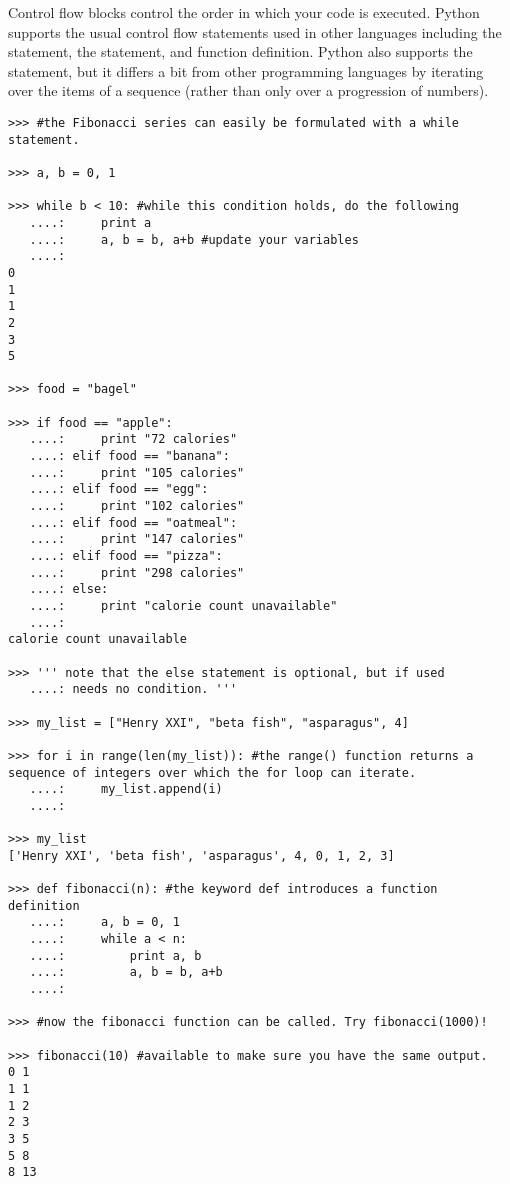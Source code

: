 \begin{example}
Control flow blocks control the order in which your code is executed.
Python supports the usual control flow statements used in other languages
including the  statement, the  statement, and function definition. 
Python also supports the  statement, but it differs a bit from other programming languages by iterating over the items of a sequence (rather than only over a progression of numbers).

\begin{lstlisting}
>>> #the Fibonacci series can easily be formulated with a while statement.

>>> a, b = 0, 1

>>> while b < 10: #while this condition holds, do the following
   ....:     print a
   ....:     a, b = b, a+b #update your variables
   ....:     
0
1
1
2
3
5

>>> food = "bagel"

>>> if food == "apple":
   ....:     print "72 calories"
   ....: elif food == "banana":
   ....:     print "105 calories"
   ....: elif food == "egg":
   ....:     print "102 calories"
   ....: elif food == "oatmeal":
   ....:     print "147 calories"
   ....: elif food == "pizza":
   ....:     print "298 calories"
   ....: else: 
   ....:     print "calorie count unavailable"
   ....:     
calorie count unavailable

>>> ''' note that the else statement is optional, but if used
   ....: needs no condition. '''
   
>>> my_list = ["Henry XXI", "beta fish", "asparagus", 4]

>>> for i in range(len(my_list)): #the range() function returns a sequence of integers over which the for loop can iterate.
   ....:     my_list.append(i)
   ....:     

>>> my_list
['Henry XXI', 'beta fish', 'asparagus', 4, 0, 1, 2, 3]

>>> def fibonacci(n): #the keyword def introduces a function definition
   ....:     a, b = 0, 1
   ....:     while a < n:
   ....:         print a, b
   ....:         a, b = b, a+b
   ....:         

>>> #now the fibonacci function can be called. Try fibonacci(1000)!

>>> fibonacci(10) #available to make sure you have the same output.
0 1
1 1
1 2
2 3
3 5
5 8
8 13

\end{lstlisting}
\end{example}

